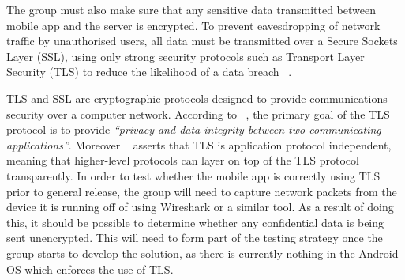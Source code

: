 The group must also make sure that any sensitive data transmitted between mobile app and the server is encrypted. To prevent eavesdropping of network traffic by unauthorised users, all data must be transmitted over a Secure Sockets Layer (SSL), using only strong security protocols such as Transport Layer Security (TLS) to reduce the likelihood of a data breach ~\parencite{web:data_encryption_in_transit}.

TLS and SSL are cryptographic protocols designed to provide communications security over a computer network. According to ~\textcite{web:tls_protocol}, the primary goal of the TLS protocol is to provide \emph{``privacy and data integrity between two communicating applications''}. Moreover ~\textcite{web:tls_protocol} asserts that TLS is application protocol independent, meaning that higher-level protocols can layer on top of the TLS protocol transparently. In order to test whether the mobile app is correctly using TLS prior to general release, the group will need to capture network packets from the device it is running off of using Wireshark or a similar tool. As a result of doing this, it should be possible to determine whether any confidential data is being sent unencrypted. This will need to form part of the testing strategy once the group starts to develop the solution, as there is currently nothing in the Android OS which enforces the use of TLS. 